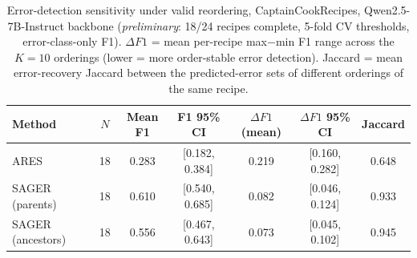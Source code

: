 \begin{table}[h]
\centering
\caption{Error-detection sensitivity under valid reordering, CaptainCookRecipes,
  Qwen2.5-7B-Instruct backbone (\emph{preliminary}: 18/24 recipes complete,
  5-fold CV thresholds, error-class-only F1). $\Delta F1$ = mean per-recipe
  max$-$min F1 range across the $K=10$ orderings (lower = more order-stable
  error detection). Jaccard = mean error-recovery Jaccard between the
  predicted-error sets of different orderings of the same recipe.}\label{tab:sager-qwen-f1-partial}
\begin{tabular}{lcccccc}
\toprule
Method & $N$ & Mean F1 & F1 95\% CI & $\Delta F1$ (mean) & $\Delta F1$ 95\% CI & Jaccard \\
\midrule
ARES               & 18 & 0.283 & [0.182, 0.384] & 0.219 & [0.160, 0.282] & 0.648 \\
SAGER (parents)     & 18 & 0.610 & [0.540, 0.685] & 0.082 & [0.046, 0.124] & 0.933 \\
SAGER (ancestors)   & 18 & 0.556 & [0.467, 0.643] & 0.073 & [0.045, 0.102] & 0.945 \\
\bottomrule
\end{tabular}
\end{table}

